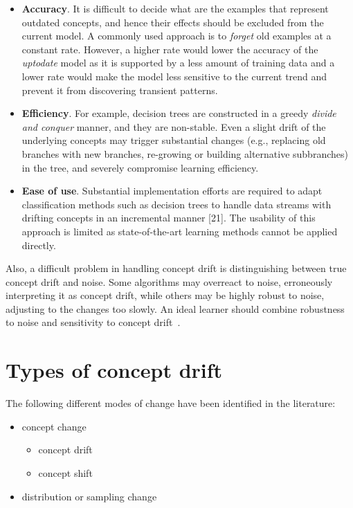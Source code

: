 \begin{itemize}
\item {\bf Accuracy}. It is difficult to decide what are the examples
that represent outdated concepts, and hence their effects
should be excluded from the current model. A commonly
used approach is to {\sl forget} old examples at a constant rate.
However, a higher rate would lower the accuracy of the {\sl uptodate} model as it is supported by a less amount of training
data and a lower rate would make the model less sensitive
to the current trend and prevent it from discovering transient
patterns.

\item  {\bf Efficiency}. For example, decision trees are constructed in a greedy {\sl divide and conquer} manner, and they are non-stable. Even a slight
drift of the underlying concepts may trigger substantial changes
(e.g., replacing old branches with new branches, re-growing
or building alternative subbranches) in the tree, and severely
compromise learning efficiency.

\item {\bf Ease of use}. Substantial implementation efforts are required
to adapt classification methods such as decision trees
to handle data streams with drifting concepts in an incremental
manner [21]. The usability of this approach is limited as
state-of-the-art learning methods cannot be applied directly.
\end{itemize}

Also, a difficult problem in handling concept drift is distinguishing between true concept
drift and noise. Some algorithms may overreact to noise, erroneously interpreting it as
concept drift, while others may be highly robust to noise, adjusting to the changes too
slowly. An ideal learner should combine robustness to noise and sensitivity to concept
drift~\cite{tsymbal-problem,WidmerKubat}.
\ENDOMIT


\BEGINOMIT
\section{Types of concept drift}

The following different modes of change have been identified in the literature:

\begin{itemize}
\item concept change
\begin{itemize}
\item concept drift
\item concept shift
\end{itemize}
\item distribution or sampling change
\end{itemize}

